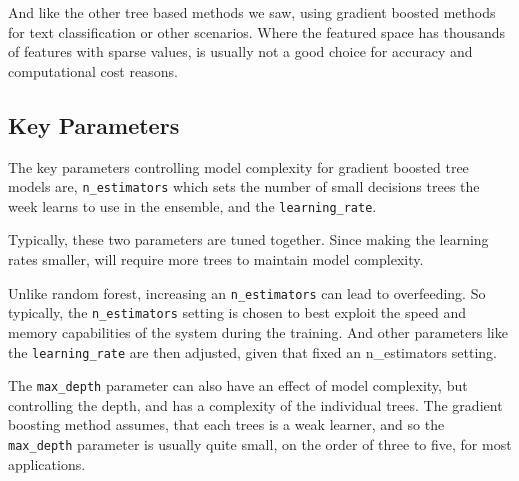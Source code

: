 \begin{multicols}{2}
And like the other tree based methods we saw, using gradient boosted methods for text classification or other scenarios. Where the featured space has thousands of features with sparse values, is usually not a good choice for accuracy and computational cost reasons. 

\subsection{Key Parameters}

The key parameters controlling model complexity for gradient boosted tree models are, \texttt{n_estimators} which sets the number of small decisions trees the week learns to use in the ensemble, and the \texttt{learning_rate}. 

Typically, these two parameters are tuned together. Since making the learning rates smaller, will require more trees to maintain model complexity. 

Unlike random forest, increasing an \texttt{n_estimators} can lead to overfeeding. So typically, the \texttt{n_estimators} setting is chosen to best exploit the speed and memory capabilities of the system during the training. And other parameters like the \texttt{learning_rate} are then adjusted, given that fixed an n_estimators setting. 

The \texttt{max_depth} parameter can also have an effect of model complexity, but controlling the depth, and has a complexity of the individual trees. The gradient boosting method assumes, that each trees is a weak learner, and so the \texttt{max_depth} parameter is usually quite small, on the order of three to five, for most applications. 

\end{multicols}
